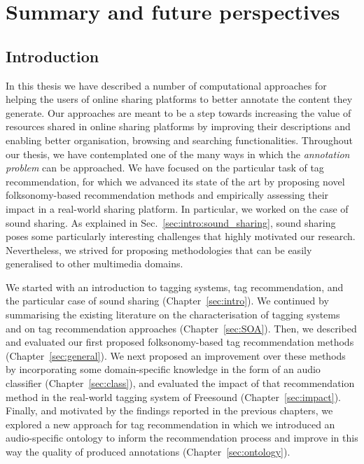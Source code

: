 
\chapter{Summary and future perspectives}
\label{sec:conclusion}

\section{Introduction}

In this thesis we have described a number of computational approaches for helping the users of online sharing platforms to better annotate the content they generate.
Our approaches are meant to be a step towards increasing the value of resources shared in online sharing platforms by improving their descriptions and enabling better organisation, browsing and searching functionalities. %
Throughout our thesis, we have contemplated one of the many ways in which the \emph{annotation problem} can be approached.
We have focused on the particular task of tag recommendation, for which we advanced its state of the art by proposing novel folksonomy-based recommendation methods and empirically assessing their impact in a real-world sharing platform.
In particular, we worked on the case of sound sharing. As explained in Sec.~\ref{sec:intro:sound_sharing}, sound sharing poses some particularly interesting challenges that highly motivated our research. Nevertheless, we strived for proposing methodologies that can be easily generalised to other multimedia domains. 

We started with an introduction to tagging systems, tag recommendation, and the particular case of sound sharing (Chapter~\ref{sec:intro}). 
We continued by summarising the existing literature on the characterisation of tagging systems and on tag recommendation approaches (Chapter~\ref{sec:SOA}).
Then, we described and evaluated our first proposed folksonomy-based tag recommendation methods (Chapter~\ref{sec:general}). 
We next proposed an improvement over these methods by incorporating some domain-specific knowledge in the form of an audio classifier (Chapter~\ref{sec:class}), and evaluated the impact of that recommendation method in the real-world tagging system of Freesound (Chapter~\ref{sec:impact}).
Finally, and motivated by the findings reported in the previous chapters, we explored a new approach for tag recommendation in which we introduced an audio-specific ontology to inform the recommendation process and improve in this way the quality of produced annotations (Chapter~\ref{sec:ontology}). 

